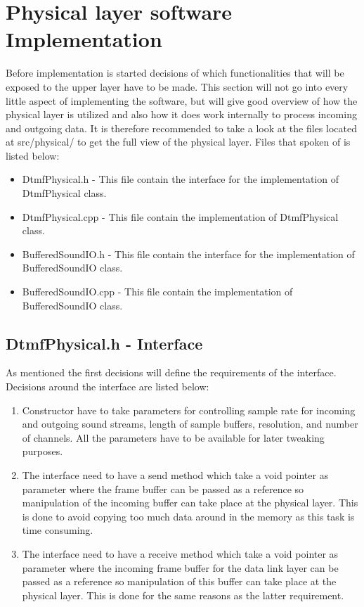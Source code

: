 \section{Physical layer software Implementation}
Before implementation is started decisions of which functionalities that will be exposed to the upper layer have to be made. This section will not go into every little aspect of implementing the software, but will give good overview of how the physical layer is utilized and also how it does work internally to process incoming and outgoing data. It is therefore recommended to take a look at the files located at src/physical/ to get the full view of the physical layer. Files that spoken of is listed below:

\begin {itemize}
\item DtmfPhysical.h - This file contain the interface for the implementation of DtmfPhysical class.
\item DtmfPhysical.cpp - This file contain the implementation of DtmfPhysical class.
\item BufferedSoundIO.h - This file contain the interface for the implementation of BufferedSoundIO class.
\item BufferedSoundIO.cpp - This file contain the implementation of BufferedSoundIO class.
\end{itemize}

	\subsection{DtmfPhysical.h - Interface}
	As mentioned the first decisions will define the requirements of the interface. Decisions around the interface are listed below:
	\begin {enumerate}
	\item Constructor have to take parameters for controlling sample rate for incoming and outgoing sound streams, length of sample buffers,
	resolution, and number of channels. All the parameters have to be available for later tweaking purposes.
	\item The interface need to have a send method which take a void pointer as parameter where the frame buffer can be passed as a reference
	so manipulation of the incoming buffer can take place at the physical layer. This is done to avoid copying too much data around in the memory as this task is time consuming.
	\item The interface need to have a receive method which take a void pointer as parameter where the incoming frame buffer for the data link
	layer can be passed as a reference so manipulation of this buffer can take place at the physical layer. This is done for the same reasons as the latter requirement.
	\end{enumerate}
	
